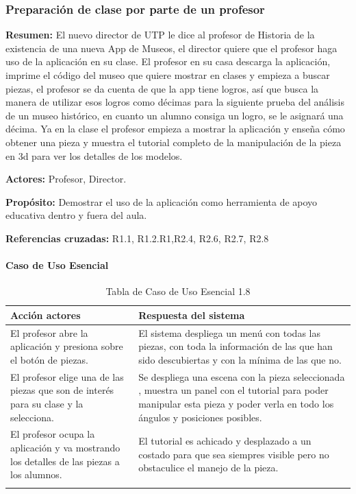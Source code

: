\subsubsection{Preparación de clase por parte de un profesor}

{\textbf {Resumen:}}
El nuevo director de UTP le dice al profesor de Historia de la existencia de una nueva App de Museos, el director quiere que el profesor haga uso de la aplicación en su clase. El profesor en su casa descarga la aplicación, imprime el código del museo que quiere mostrar en clases y empieza a buscar piezas, el profesor se da cuenta de que la app tiene logros, así que busca la manera de utilizar esos logros como décimas para la siguiente prueba del análisis de un museo histórico, en cuanto un alumno consiga un logro, se le asignará una décima. Ya en la clase el profesor empieza a mostrar la aplicación y enseña cómo obtener una pieza y muestra el tutorial completo de la manipulación de la pieza en 3d para ver los detalles de los modelos.


{\textbf {Actores:}}
Profesor, Director.

{\textbf {Propósito:}}
Demostrar el uso de la aplicación como herramienta de apoyo educativa dentro y fuera del aula.

{\textbf {Referencias cruzadas:}}
R1.1, R1.2.R1,R2.4, R2.6, R2.7, R2.8

\paragraph{Caso de Uso Esencial}

\begin{longtable}{|p{5cm}|p{8cm}|}
\hline 
Acción actores & Respuesta del sistema \\ 
\hline 
El profesor abre la aplicación y presiona sobre el botón de piezas. & El sistema despliega un menú con todas las piezas, con toda la información de las que han sido descubiertas y con la mínima de las que no. \\ 
\hline
El profesor elige una de las piezas que son de interés para su clase y la selecciona. & Se despliega una escena con la pieza seleccionada , muestra un panel con el tutorial para poder manipular esta pieza y poder verla en todo los ángulos y posiciones posibles. \\ 
\hline 
El profesor ocupa la aplicación y va mostrando los detalles de las piezas a los alumnos. & El tutorial es achicado y desplazado a un costado para que sea siempres visible pero no obstaculice el manejo de la pieza. \\ 
\hline 
\caption{Tabla de Caso de Uso Esencial 1.8}
\label{tab28}
\end{longtable}

